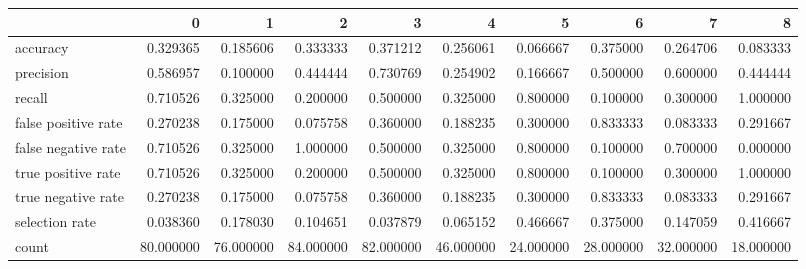 \begin{tabular}{lrrrrrrrrr}
\toprule
{} &          0 &          1 &          2 &          3 &          4 &          5 &          6 &          7 &          8 \\
\midrule
accuracy            &   0.329365 &   0.185606 &   0.333333 &   0.371212 &   0.256061 &   0.066667 &   0.375000 &   0.264706 &   0.083333 \\
precision           &   0.586957 &   0.100000 &   0.444444 &   0.730769 &   0.254902 &   0.166667 &   0.500000 &   0.600000 &   0.444444 \\
recall              &   0.710526 &   0.325000 &   0.200000 &   0.500000 &   0.325000 &   0.800000 &   0.100000 &   0.300000 &   1.000000 \\
false positive rate &   0.270238 &   0.175000 &   0.075758 &   0.360000 &   0.188235 &   0.300000 &   0.833333 &   0.083333 &   0.291667 \\
false negative rate &   0.710526 &   0.325000 &   1.000000 &   0.500000 &   0.325000 &   0.800000 &   0.100000 &   0.700000 &   0.000000 \\
true positive rate  &   0.710526 &   0.325000 &   0.200000 &   0.500000 &   0.325000 &   0.800000 &   0.100000 &   0.300000 &   1.000000 \\
true negative rate  &   0.270238 &   0.175000 &   0.075758 &   0.360000 &   0.188235 &   0.300000 &   0.833333 &   0.083333 &   0.291667 \\
selection rate      &   0.038360 &   0.178030 &   0.104651 &   0.037879 &   0.065152 &   0.466667 &   0.375000 &   0.147059 &   0.416667 \\
count               &  80.000000 &  76.000000 &  84.000000 &  82.000000 &  46.000000 &  24.000000 &  28.000000 &  32.000000 &  18.000000 \\
\bottomrule
\end{tabular}
